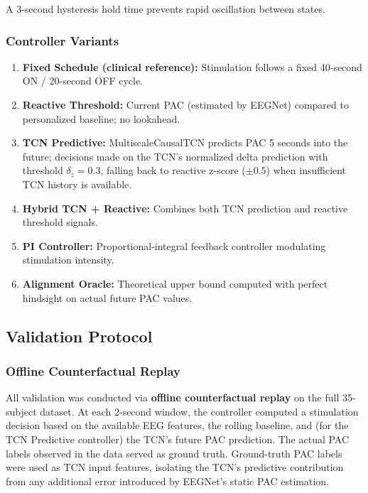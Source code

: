 \documentclass[11pt,letterpaper]{article}
\begin{document}
A 3-second hysteresis hold time prevents rapid oscillation between states.

\subsubsection{Controller Variants}

\begin{enumerate}[nosep]
  \item \textbf{Fixed Schedule (clinical reference):} Stimulation follows a fixed 40-second ON / 20-second OFF cycle.
  \item \textbf{Reactive Threshold:} Current PAC (estimated by EEGNet) compared to personalized baseline; no lookahead.
  \item \textbf{TCN Predictive:} MultiscaleCausalTCN predicts PAC 5 seconds into the future; decisions made on the TCN's normalized delta prediction with threshold $\delta_z = 0.3$, falling back to reactive z-score ($\pm 0.5$) when insufficient TCN history is available.
  \item \textbf{Hybrid TCN + Reactive:} Combines both TCN prediction and reactive threshold signals.
  \item \textbf{PI Controller:} Proportional-integral feedback controller modulating stimulation intensity.
  \item \textbf{Alignment Oracle:} Theoretical upper bound computed with perfect hindsight on actual future PAC values.
\end{enumerate}

\subsection{Validation Protocol}

\subsubsection{Offline Counterfactual Replay}

All validation was conducted via \textbf{offline counterfactual replay} on the full 35-subject dataset. At each 2-second window, the controller computed a stimulation decision based on the available EEG features, the rolling baseline, and (for the TCN Predictive controller) the TCN's future PAC prediction. The actual PAC labels observed in the data served as ground truth. Ground-truth PAC labels were used as TCN input features, isolating the TCN's predictive contribution from any additional error introduced by EEGNet's static PAC estimation.
\end{document}
